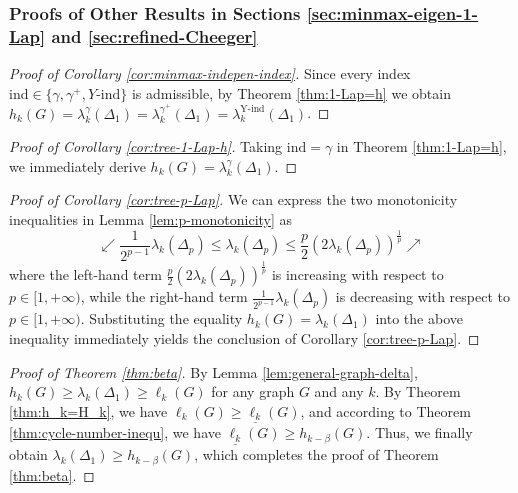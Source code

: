 \documentclass[12pt, reqno]{article}
\begin{document}
\subsubsection{Proofs of Other Results in Sections \ref{sec:minmax-eigen-1-Lap} and \ref{sec:refined-Cheeger}
}

\begin{proof}[Proof of Corollary \ref{cor:minmax-indepen-index}]
Since every index $\mathrm{ind}\in\{\gamma,\gamma^+,Y\textrm{-ind}\}$ is admissible, by Theorem \ref{thm:1-Lap=h} we obtain $h_k(G)=\lambda_k^{\gamma}(\Delta_1)=\lambda_k^{\gamma^+}(\Delta_1) =\lambda_k^{\textrm{Y-ind}}(\Delta_1)$. 
\end{proof}

\begin{proof}[Proof of Corollary \ref{cor:tree-1-Lap-h}]
Taking $\mathrm{ind}=\gamma$ in Theorem \ref{thm:1-Lap=h}, we immediately derive $h_k(G)=\lambda_k^{\gamma}(\Delta_1)$. 
\end{proof}


\begin{proof}[Proof of Corollary \ref{cor:tree-p-Lap}]
We can express the two monotonicity inequalities in  Lemma \ref{lem:p-monotonicity} as
$$
\swarrow\frac{1}{2^{p-1}}\lambda_k(\Delta_p)\le \lambda_k(\Delta_p)\le \frac p2 (2\lambda_k(\Delta_p))^{\frac1p}\nearrow
$$
where the left-hand term $\frac p2 (2\lambda_k(\Delta_p))^{\frac1p}$ is increasing with respect to $p\in[1,+\infty)$, while the right-hand term $\frac{1}{2^{p-1}}\lambda_k(\Delta_p)$ is decreasing with respect to $p\in[1,+\infty)$. 
Substituting the equality $h_k(G)=\lambda_k(\Delta_1)$ into the above inequality immediately yields the conclusion of Corollary \ref{cor:tree-p-Lap}. 
\end{proof}

\begin{proof}[Proof of Theorem  \ref{thm:beta}]
By Lemma \ref{lem:general-graph-delta}, $h_k(G)\ge \lambda_k(\Delta_1)\ge \ell_k(G)$ for any graph $G$ and any $k$. By Theorem \ref{thm:h_k=H_k}, we have $\ell_k(G)\ge \underline{\ell_k}(G)$, and according to Theorem \ref{thm:cycle-number-inequ}, we have $\underline{\ell_k}(G)\ge h_{k-\beta}(G)$. Thus, we finally obtain $\lambda_k(\Delta_1)\ge h_{k-\beta}(G)$, which completes the proof of Theorem \ref{thm:beta}.
\end{proof}
\end{document}
